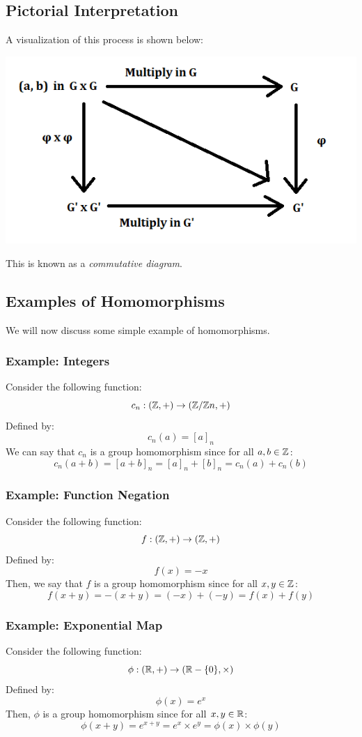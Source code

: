 \documentclass[letterpaper]{article}
\begin{document}
\subsection{Pictorial Interpretation}
A visualization of this process is shown below: 
\begin{center}
    \includegraphics[scale=0.7]{assets/homo_diagram.png}
\end{center}
This is known as a \emph{commutative diagram}.

\subsection{Examples of Homomorphisms}
We will now discuss some simple example of homomorphisms. 

\subsubsection{Example: Integers}
Consider the following function: 
\[c_n: (\mathbb{Z}, +) \to (\mathbb{Z} / \mathbb{Z} n, +)\]
Defined by: 
\[c_{n}(a) = [a]_n\]
We can say that $c_n$ is a group homomorphism since for all $a, b \in \mathbb{Z}$: 
\[c_{n}(a + b) = [a + b]_n = [a]_n + [b]_n = c_{n}(a) + c_{n}(b)\]

\subsubsection{Example: Function Negation}
Consider the following function: 
\[f: (\mathbb{Z}, +) \to (\mathbb{Z}, +)\]
Defined by: 
\[f(x) = -x\]
Then, we say that $f$ is a group homomorphism since for all $x, y \in \mathbb{Z}$: 
\[f(x + y) = -(x + y) = (-x) + (-y) = f(x) + f(y)\]

\subsubsection{Example: Exponential Map}
Consider the following function: 
\[\phi: (\mathbb{R}, +) \to (\mathbb{R} - \{0\}, \times)\]
Defined by: 
\[\phi(x) = e^x\]
Then, $\phi$ is a group homomorphism since for all $x, y \in \mathbb{R}$: 
\[\phi(x + y) = e^{x + y} = e^x \times e^y = \phi(x) \times \phi(y)\]
\end{document}
